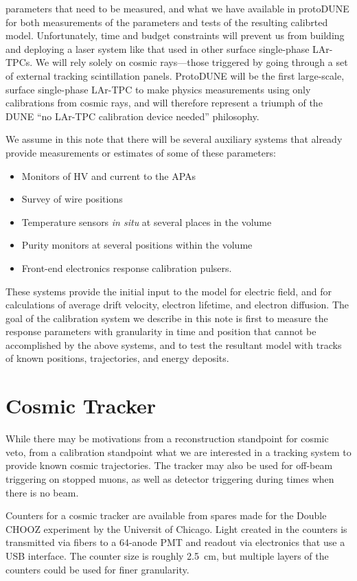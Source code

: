 parameters that need to be measured, and what we have available in protoDUNE
for both measurements of the parameters and tests of the resulting calibrted
model.  Unfortunately, time and budget constraints will prevent us from
building and deploying a laser system like that used in other surface
single-phase LAr-TPCs.  We will rely solely on cosmic rays---those triggered by
going through a set of external tracking scintillation panels.  ProtoDUNE will
be the first large-scale, surface single-phase LAr-TPC to make physics
measurements using only calibrations from cosmic rays, and will therefore
represent a triumph of the DUNE ``no LAr-TPC calibration device needed''
philosophy.

We assume in this note that there will be
several auxiliary systems that already provide measurements or estimates of
some of these parameters:
\begin{itemize}
\item Monitors of HV and current to the APAs
\item Survey of wire positions
\item Temperature sensors {\it in situ} at several places in the volume
\item Purity monitors at several positions within the volume
\item Front-end electronics response calibration pulsers.
\end{itemize}
        These systems provide the initial input to the model for electric
field, and for calculations of average drift velocity, electron lifetime, and
electron diffusion.  The goal of the calibration system we describe in this
note is first to measure the response parameters with granularity in time and
position that cannot be accomplished by the above systems, and to test the
resultant model with tracks of known positions, trajectories, and energy
deposits.

\section{Cosmic Tracker}

        While there may be motivations from a reconstruction standpoint for
cosmic veto, from a calibration standpoint what we are interested in a tracking
system to provide known cosmic trajectories.  The tracker may also be used for
off-beam triggering on stopped muons, as well as detector triggering during
times when there is no beam.

        Counters for a cosmic tracker are available from spares made for the
Double CHOOZ experiment by the Universit of Chicago. Light created in the
counters is transmitted via fibers to a 64-anode PMT and readout via
electronics that use a USB interface.  The counter size is roughly 2.5~cm, but
multiple layers of the counters could be used for finer granularity.

